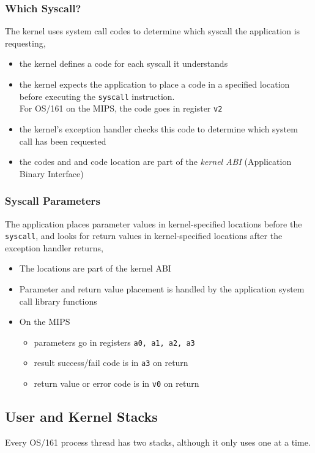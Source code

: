 \documentclass[12pt]{article}
\theoremstyle{plain}
\theoremstyle{definition}
\begin{document}
\subsubsection{Which Syscall?}
The kernel uses system call codes to determine which syscall the application is requesting,
\begin{itemize}
  \item the kernel defines a code for each syscall it understands
  \item the kernel expects the application to place a code in a specified location before executing the \texttt{syscall} instruction. \\
  For OS/161 on the MIPS, the code goes in register \texttt{v2}
  \item the kernel's exception handler checks this code to determine which system call has been requested
  \item the codes and and code location are part of the \emph{kernel ABI} (Application Binary Interface)
\end{itemize}

\subsubsection{Syscall Parameters}
The application places parameter values in kernel-specified locations before the \texttt{syscall}, and looks for return values in kernel-specified locations after the exception handler returns,
\begin{itemize}
  \item The locations are part of the kernel ABI
  \item Parameter and return value placement is handled by the application system call library functions
  \item On the MIPS
  \begin{itemize}
    \item parameters go in registers \texttt{a0, a1, a2, a3}
    \item result success/fail code is in \texttt{a3} on return
    \item return value or error code is in \texttt{v0} on return
  \end{itemize}
\end{itemize}

\subsection{User and Kernel Stacks}
Every OS/161 process thread has two stacks, although it only uses one at a time. \\
\end{document}
